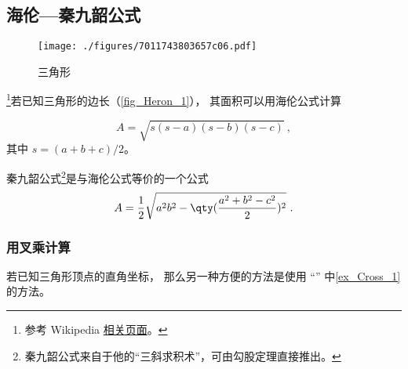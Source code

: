 

\subsection{海伦—秦九韶公式}
\begin{figure}[ht]
\centering
\texttt{[image: ./figures/7011743803657c06.pdf]}
\caption{三角形} \label{fig_Heron_1}
\end{figure}
\footnote{参考 Wikipedia \href{https://en.wikipedia.org/wiki/Heron's_formula}{相关页面}。}若已知三角形的边长（\autoref{fig_Heron_1}）， 其面积可以用海伦公式计算

\begin{equation}\label{eq_Heron_1}
A = \sqrt{s(s-a)(s-b)(s-c)}~,
\end{equation}
其中 $s = (a+b+c)/2$。

秦九韶公式\footnote{秦九韶公式来自于他的“三斜求积术”，可由勾股定理直接推出。}是与海伦公式等价的一个公式
\begin{equation}
A = \frac{1}{2}\sqrt{a^2b^2-\qty(\frac{a^2+b^2-c^2}{2})^2}~.
\end{equation}

\subsubsection{用叉乘计算}
若已知三角形顶点的直角坐标， 那么另一种方便的方法是使用 “” 中\autoref{ex_Cross_1}  的方法。

